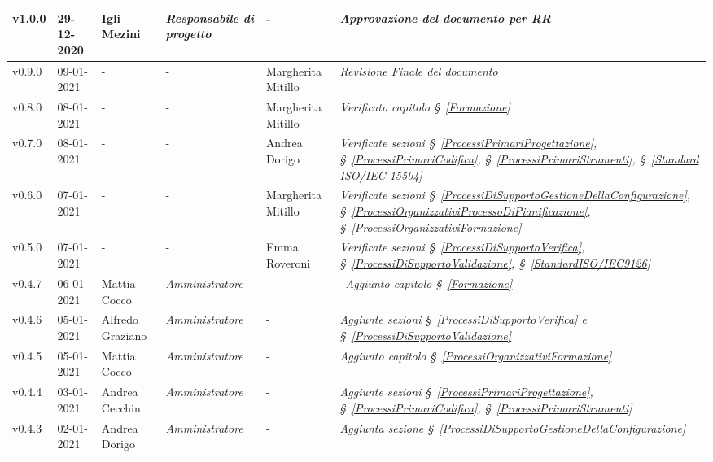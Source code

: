 {\begin{center}
\begin{longtable}[c]{|p{2cm-1\tabcolsep}|p{2cm}|p{3cm-2\tabcolsep}|p{3cm-1.5\tabcolsep}|p{}|p{4cm-2\tabcolsep}|}
		\hline
		\centering v1.0.0 & 29-12-2020 & Igli Mezini & \centering \textit{Responsabile di progetto} & \centering - & \textit{Approvazione del documento per RR} \\
		\hline
		\centering v0.9.0 & 09-01-2021 & \centering - & \centering - & Margherita Mitillo & \textit{Revisione Finale del documento} \\
		\hline
		\centering v0.8.0 & 08-01-2021 & \centering - & \centering - & Margherita Mitillo & \textit{Verificato capitolo \S~\ref{Formazione}} \\
		\hline
		\centering v0.7.0 & 08-01-2021 & \centering - & \centering - & Andrea Dorigo & \textit{Verificate sezioni \S~\ref{ProcessiPrimariProgettazione}, \S~\ref{ProcessiPrimariCodifica}, \S~\ref{ProcessiPrimariStrumenti}, \S~\ref{Standard ISO/IEC 15504} } \\
		\hline
		\centering v0.6.0 & 07-01-2021 & \centering - & \centering - & Margherita Mitillo & \textit{Verificate sezioni \S~\ref{ProcessiDiSupportoGestioneDellaConfigurazione}, \S~\ref{ProcessiOrganizzativiProcessoDiPianificazione}, \S~\ref{ProcessiOrganizzativiFormazione}} \\
		\hline
		\centering v0.5.0 & 07-01-2021 & \centering - & \centering - & Emma Roveroni & \textit{Verificate sezioni \S~\ref{ProcessiDiSupportoVerifica}, \S~\ref{ProcessiDiSupportoValidazione}, \S~\ref{StandardISO/IEC9126}}  \\
		\hline
		\centering v0.4.7 & 06-01-2021 & Mattia Cocco & \centering \textit{Amministratore} & \centering - & \	\textit{Aggiunto capitolo \S~\ref{Formazione}} \\
		\hline
		\centering v0.4.6 & 05-01-2021 & Alfredo Graziano & \centering \textit{Amministratore} & \centering - & \textit{Aggiunte sezioni \S~\ref{ProcessiDiSupportoVerifica} e \S~\ref{ProcessiDiSupportoValidazione} } \\
		\hline
		\centering v0.4.5 & 05-01-2021 & Mattia Cocco & \centering \textit{Amministratore} & \centering - & \textit{Aggiunto capitolo \S~\ref{ProcessiOrganizzativiFormazione}} \\
		\hline
		\centering v0.4.4 & 03-01-2021 & Andrea Cecchin & \centering \textit{Amministratore} & \centering - & \textit{Aggiunte sezioni \S~\ref{ProcessiPrimariProgettazione}, \S~\ref{ProcessiPrimariCodifica}, \S~\ref{ProcessiPrimariStrumenti}} \\
		\hline
		\centering v0.4.3 & 02-01-2021 & Andrea Dorigo & \centering \textit{Amministratore} & \centering - & \textit{Aggiunta sezione \S~\ref{ProcessiDiSupportoGestioneDellaConfigurazione}} \\

\end{longtable}
\end{center}}
